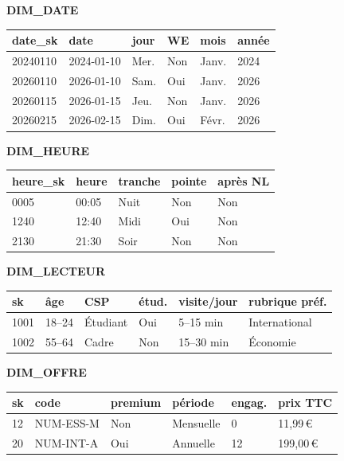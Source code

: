\documentclass[a4paper,12pt]{article}
\begin{document}
\begin{center}
\scriptsize
\setlength{\tabcolsep}{3pt}
\renewcommand{\arraystretch}{1.1}

\begin{minipage}[t]{0.49\linewidth}\centering
\textbf{DIM\_DATE}\\[2pt]
\begin{tabular}{@{}llllll@{}}
  \toprule
  date\_sk & date & jour & WE & mois & année \\
  \midrule
  20240110 & 2024-01-10 & Mer. & Non & Janv. & 2024 \\
  20260110 & 2026-01-10 & Sam. & Oui & Janv. & 2026 \\
  20260115 & 2026-01-15 & Jeu. & Non & Janv. & 2026 \\
  20260215 & 2026-02-15 & Dim. & Oui & Févr. & 2026 \\
  \bottomrule
\end{tabular}
\end{minipage}%
\hfill%
\begin{minipage}[t]{0.49\linewidth}\centering
\textbf{DIM\_HEURE}\\[2pt]
\begin{tabular}{@{}lllll@{}}
  \toprule
  heure\_sk & heure & tranche & pointe & après NL \\
  \midrule
  0005 & 00:05 & Nuit & Non & Non \\
  1240 & 12:40 & Midi & Oui & Non \\
  2130 & 21:30 & Soir & Non & Non \\
  \bottomrule
\end{tabular}
\end{minipage}

\medskip

\begin{minipage}[t]{0.49\linewidth}\centering
\textbf{DIM\_LECTEUR}\\[2pt]
\begin{tabular}{@{}llllll@{}}
  \toprule
  sk & âge & CSP & étud. & visite/jour & rubrique préf. \\
  \midrule
  1001 & 18--24 & Étudiant & Oui & 5--15 min  & International \\
  1002 & 55--64 & Cadre    & Non & 15--30 min & Économie \\
  \bottomrule
\end{tabular}
\end{minipage}%
\hfill%
\begin{minipage}[t]{0.49\linewidth}\centering
\textbf{DIM\_OFFRE}\\[2pt]
\begin{tabular}{@{}llllll@{}}
  \toprule
  sk & code & premium & période & engag. & prix TTC \\
  \midrule
  12 & NUM-ESS-M & Non & Mensuelle & 0  & 11,99\,€ \\
  20 & NUM-INT-A & Oui & Annuelle  & 12 & 199,00\,€ \\
  \bottomrule
\end{tabular}
\end{minipage}


\end{center}
\end{document}
